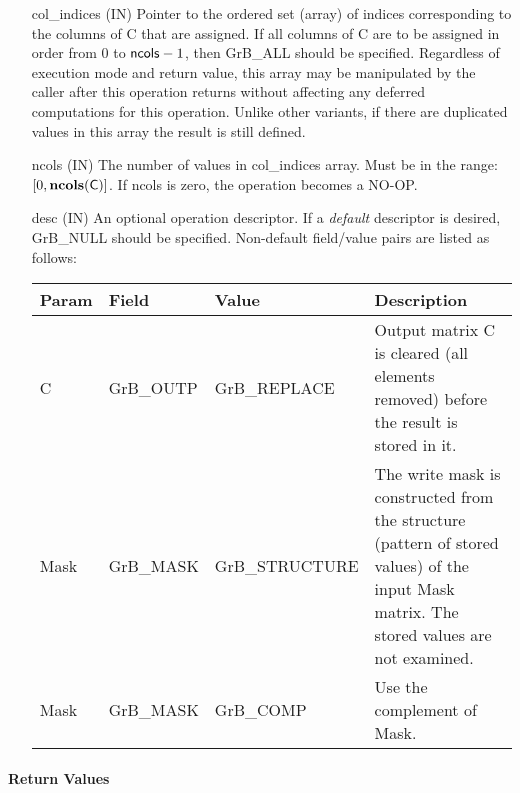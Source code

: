 \begin{itemize}[leftmargin=1.1in]
    \item[{\sf col\_indices}] ({\sf IN}) Pointer to the ordered set (array) of 
    indices corresponding to the columns of {\sf C} that are assigned.  If all 
    columns of {\sf C} are to be assigned in order from $0$ to ${\sf ncols} - 1$, 
    then {\sf GrB\_ALL} should be specified.  Regardless of execution mode and return
    value, this array may be manipulated by the caller after this operation 
    returns without affecting any deferred computations for this operation.
    Unlike other variants, if there are duplicated values in this array the 
    result is still defined.

    \item[{\sf ncols}] ({\sf IN}) The number of values in {\sf col\_indices}
    array. Must be in the range: $[0, \bold{ncols}({\sf C})]$.  If
    {\sf ncols} is zero, the operation becomes a NO-OP.

    \item[{\sf desc}] ({\sf IN}) An optional operation descriptor. If
    a \emph{default} descriptor is desired, {\sf GrB\_NULL} should be
    specified. Non-default field/value pairs are listed as follows:  \\

    \hspace*{-2em}\begin{tabular}{lllp{2.7in}}
        Param & Field  & Value & Description \\
        \hline
        {\sf C}    & {\sf GrB\_OUTP} & {\sf GrB\_REPLACE} & Output matrix {\sf C}
        is cleared (all elements removed) before the result is stored in it.\\

        {\sf Mask} & {\sf GrB\_MASK} & {\sf GrB\_STRUCTURE}   & The write mask is
        constructed from the structure (pattern of stored values) of the input
        {\sf Mask} matrix. The stored values are not examined.\\

        {\sf Mask} & {\sf GrB\_MASK} & {\sf GrB\_COMP}   & Use the 
        complement of {\sf Mask}. \\
    \end{tabular}
\end{itemize}

\paragraph{Return Values}

